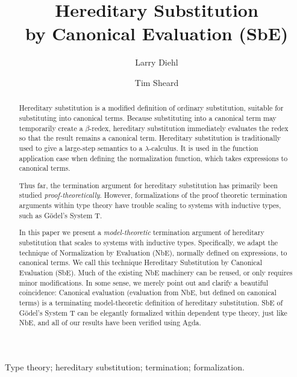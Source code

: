 \documentclass{llncs}
\newcommand{\by}[1]{(#1)}
\begin{document}
\frontmatter
\pagestyle{headings}

\title{Hereditary Substitution \\by Canonical Evaluation (SbE)}

\author{Larry Diehl \and Tim Sheard}


\maketitle

\begin{abstract}

Hereditary substitution is a modified definition of ordinary
substitution, suitable for substituting into canonical terms. Because
substituting into a canonical term may temporarily create a $\beta$-redex,
hereditary substitution immediately evaluates the redex so that the
result remains a canonical term. Hereditary substitution is
traditionally used to give a large-step semantics to a
$\lambda$-calculus. It is used in the function application case when
defining the normalization function, which takes expressions to canonical terms.

Thus far, the termination argument for hereditary substitution has
primarily been studied \textit{proof-theoretically}. However, formalizations of
the proof theoretic termination arguments within type theory have
trouble scaling to systems with inductive types, such as
G{\"o}del's System T.

In this paper we present a \textit{model-theoretic}
termination argument of hereditary substitution that scales to
systems with inductive types. Specifically, we adapt the technique of
Normalization by Evaluation (NbE), normally defined on expressions, to
canonical terms. We call this technique Hereditary Substitution by
Canonical Evaluation (SbE). Much of the existing NbE machinery can be reused, or
only requires minor modifications. In some sense, we merely point out
and clarify a beautiful coincidence: Canonical evaluation (evaluation
from NbE, but defined on canonical terms) is a
terminating model-theoretic definition of hereditary substitution.
SbE of G{\"o}del's System T can be elegantly formalized within
dependent type theory, just like NbE, and all of our results have been
verified using Agda.
\end{abstract}

\keywords
Type theory; hereditary substitution; termination; formalization.
\end{document}
